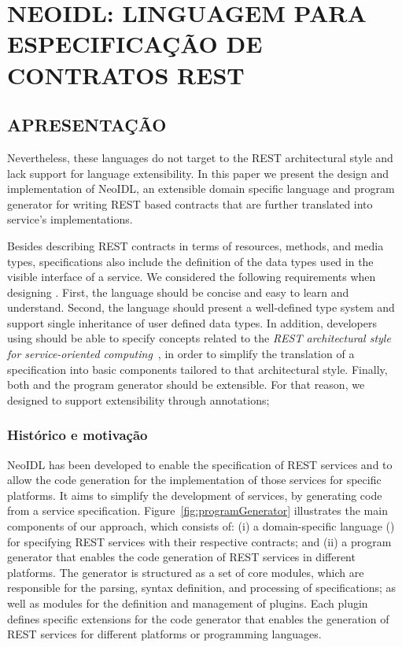 \chapter{NEOIDL: LINGUAGEM PARA ESPECIFICAÇÃO DE CONTRATOS REST}
\vspace{-6mm}


\section{APRESENTAÇÃO}

Nevertheless, these languages do not target
to the REST architectural style and 
lack support for language extensibility. In this paper we present the design and implementation of 
NeoIDL, an extensible domain specific language and program generator for writing REST based
contracts that are further translated into service's implementations.

Besides describing REST contracts in terms of resources,
methods, and media types, \neoidl{} specifications also include the
definition of the data types used in the visible interface of a service. 
We considered the following requirements when designing \neoidl.
First, the language should be concise and easy to learn and
understand.
Second, the language should present a well-defined type system
and support single inheritance of user defined data types. In
addition, developers using \neoidl{} should be able to specify
concepts related to the \emph{REST architectural style for service-oriented
  computing}~\cite{fielding-rest:2002}, in order to simplify the translation of a \neoidl{}
specification into basic components tailored to that architectural style. Finally,
both \neoidl{} and the program generator should be extensible. For
that reason, we designed \neoidl{} to support extensibility 
through annotations;

\subsection{Histórico e motivação}
\vspace{-6mm}


NeoIDL has been developed to enable the specification of REST 
services and to allow the code generation for the implementation 
of those services for specific platforms.
It aims to simplify the development of
services, by generating code from a
service specification. Figure~\ref{fig:programGenerator} illustrates
the main components of our approach, which consists
of: (i) a domain-specific language (\neoidl)
for specifying REST services with their respective
contracts; and (ii) a
program generator that enables the code generation of REST services
in different platforms. 
The \neoidl{} generator is structured as a set of
core modules, which are responsible for the parsing,
syntax definition, and processing of \neoidl{} specifications;
as well as modules for the definition and
management of \neoidl{} plugins. Each \neoidl{} plugin
defines specific extensions for the code generator
that enables the generation of REST services for different platforms
or programming languages.

